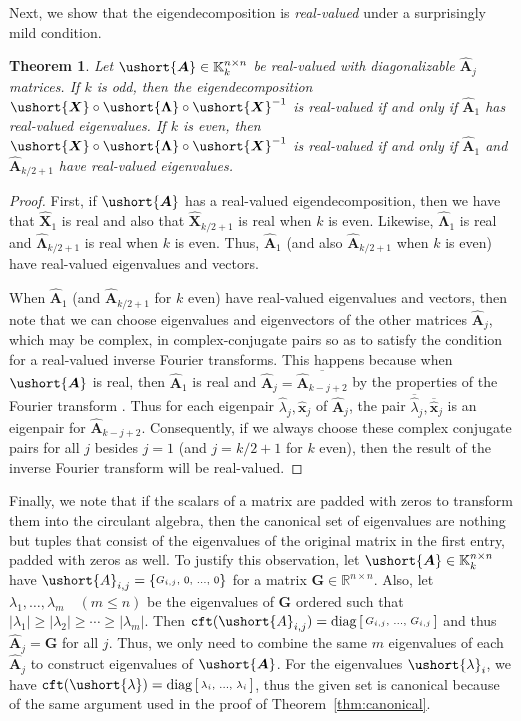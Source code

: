 \documentclass[1p,authoryear,letterpaper]{elsarticle}
\renewcommand{\cite}{\citep}
\newtheorem{theorem}{Theorem}
\providecommand{\KK}{\mathbb{K}}
\newcommand{\conj}[1]{\overline{#1}}
\providecommand{\sbmat}[1]{\left[\begin{smallmatrix} #1 \end{smallmatrix}\right]}
\providecommand{\mat}{\boldsymbol}
\renewcommand{\vec}{\mathbf}
\providecommand{\mG}{\ensuremath{\mat{G}}}
\providecommand{\mhat}[1]{\ensuremath{\mat{\hat{#1}}}}
\providecommand{\vhat}[1]{\ensuremath{\vec{\hat{#1}}}}
\providecommand{\mAhat}{\mhat{A}}
\providecommand{\vxhat}{\vhat{x}}
\DeclareMathOperator{\cft}{\texttt{cft}}
\newcommand{\cel}[1]{\ushort{#1}}
\newcommand{\csbmat}[1]{\left\{\! \begin{smallmatrix} #1
\end{smallmatrix} \! \right\}}
\newcommand{\celm}[1]{\cel{\mat{#1}}}
\newcommand{\clambda}{\ensuremath{\cel{\lambda}}}
\providecommand{\cmA}{\ensuremath{\celm{A}}}
\providecommand{\cmX}{\ensuremath{\celm{X}}}
\newcommand{\mLambdahat}{\mat{\hat{\Lambda}}}
\newcommand{\mXhat}{\mat{\hat{X}}}
\providecommand{\cmLambda}{\ensuremath{\celm{\Lambda}}}
\begin{document}
Next, we show that the eigendecomposition is \emph{real-valued}
under a surprisingly mild condition.
\begin{theorem} \label{thm:real-eigendecomposition}
 Let $\cmA \in \KK_k^{n \times n}$ be real-valued with
 diagonalizable $\mAhat_j$ matrices.  If $k$ is odd, then
 the eigendecomposition
 $\cmX \circ \cmLambda \circ \cmX^{-1}$ is
 real-valued if and only if $\mAhat_1$ has real-valued
 eigenvalues.  If $k$ is even, then
 $\cmX \circ \cmLambda \circ \cmX^{-1}$ is
 real-valued if and only if $\mAhat_1$ and $\mAhat_{k/2 + 1}$
 have real-valued eigenvalues.
\end{theorem}
\begin{proof}
First, if $\cmA$ has a real-valued
eigendecomposition, then we have that
$\mXhat_1$ is real and also that $\mXhat_{k/2+1}$
is real when $k$ is even.  Likewise,
$\mLambdahat_1$ is real and $\mLambdahat_{k/2+1}$
is real when $k$ is even.  Thus, $\mAhat_1$ (and
also $\mAhat_{k/2+1}$ when $k$ is even) have real-valued
eigenvalues and vectors.

When $\mAhat_1$ (and $\mAhat_{k/2+1}$ for $k$ even)
have real-valued eigenvalues and vectors, then note that
we can choose eigenvalues and eigenvectors of the
other matrices $\mAhat_j$, which may be complex, in
complex-conjugate pairs so as to satisfy the condition
for a real-valued inverse Fourier transforms.  This
happens because when $\cmA$ is real, then
$\mAhat_1$ is real and
 $\mAhat_j = \conj{\mAhat_{k-j+2}}$ by the properties
 of the Fourier transform \cite{davis1979-circulant}.
 Thus for each eigenpair $\hat{\lambda}_j, \vxhat_j$ of
 $\mAhat_j$, the  pair $\conj{\hat{\lambda}}_j,
 \conj{\vxhat}_j$ is an eigenpair for $\mAhat_{k-j+2}$.
 Consequently, if we always choose these complex conjugate pairs
 for all $j$ besides $j=1$ (and $j=k/2+1$ for $k$ even), then
 the result of the inverse Fourier transform will be real-valued.
\end{proof}

Finally, we note that if the scalars of a matrix are
padded with zeros to transform them into the circulant algebra, then 
the canonical set of eigenvalues are nothing but tuples that consist of 
the eigenvalues of the original matrix in the first entry, 
padded with zeros as well. To justify this observation, let 
$\cmA \in \KK_k^{n \times n}$ have $\cel{A}_{i,j}
= \csbmat{G_{i,j}, & 0, & \ldots, & 0}$
for a  matrix $\mG \in \mathbb{R}^{n \times n}$.
Also, let $\lambda_1, \ldots, \lambda_m \quad (m \le n)$ be the eigenvalues of
$\mG$ ordered such that
$|\lambda_1| \ge |\lambda_2| \ge \cdots \ge |\lambda_m|$.
Then
$\cft(\cel{A}_{i,j}) = \diag\sbmat{ G_{i,j}, & \ldots, & G_{i,j} }$
and thus $\mAhat_{j} = \mG$ for all $j$.  Thus, we only need to combine
the same $m$ eigenvalues of each $\mAhat_j$ to construct eigenvalues of
$\cmA$.  For the eigenvalues $\clambda_i$, we have $\cft(\clambda) =
\diag\sbmat{ \lambda_i, & \ldots, & \lambda_i }$, thus the given set
is  canonical because of the same argument used
in the proof of Theorem~\ref{thm:canonical}.
\end{document}
